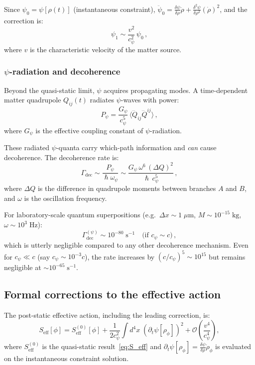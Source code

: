 \documentclass[12pt,a4paper]{article}
\theoremstyle{definition}
\theoremstyle{remark}
\newcommand{\hbar}{\hslash}
\newcommand{\order}{\mathcal{O}}
\begin{document}
Since $\psi_0 = \psi[\rho(t)]$ (instantaneous constraint),
$\ddot{\psi}_0 = \frac{\delta\psi}{\delta\rho}\ddot{\rho}
+ \frac{\delta^2\psi}{\delta\rho^2}(\dot{\rho})^2$,
and the correction is:
\begin{equation}
\psi_1 \sim \frac{v^2}{c_\psi^2}\,\psi_0\,,
\end{equation}
where $v$ is the characteristic velocity of the matter source.

\subsubsection{$\psi$-radiation and decoherence}

Beyond the quasi-static limit, $\psi$ acquires propagating modes.  A
time-dependent matter quadrupole $Q_{ij}(t)$ radiates $\psi$-waves with power:
\begin{equation}
P_\psi = \frac{G_\psi}{c_\psi^5}\,\langle\dddot{Q}_{ij}\dddot{Q}^{ij}\rangle\,,
\end{equation}
where $G_\psi$ is the effective coupling constant of $\psi$-radiation.

These radiated $\psi$-quanta carry which-path information and \emph{can}
cause decoherence.  The decoherence rate is:
\begin{equation}
\Gamma_{\mathrm{dec}} \sim \frac{P_\psi}{\hbar\omega_\psi}
\sim \frac{G_\psi\,\omega^6\,(\Delta Q)^2}{\hbar\,c_\psi^5}\,,
\end{equation}
where $\Delta Q$ is the difference in quadrupole moments between branches $A$
and $B$, and $\omega$ is the oscillation frequency.

For laboratory-scale quantum superpositions (e.g.\ $\Delta x \sim 1\;\mu\mathrm{m}$,
$M \sim 10^{-15}\;\mathrm{kg}$, $\omega \sim 10^3\;\mathrm{Hz}$):
\begin{equation}
\Gamma_{\mathrm{dec}}^{(\psi)} \sim 10^{-80}\;\mathrm{s^{-1}}
\quad\text{(if $c_\psi \sim c$)}\,,
\end{equation}
which is utterly negligible compared to any other decoherence mechanism.
Even for $c_\psi \ll c$ (say $c_\psi \sim 10^{-3}c$), the rate increases
by $(c/c_\psi)^5 \sim 10^{15}$ but remains negligible at $\sim 10^{-65}\;\mathrm{s^{-1}}$.

\subsection{Formal corrections to the effective action}

The post-static effective action, including the leading correction, is:
\begin{equation}
\label{eq:S_eff_corrected}
S_{\mathrm{eff}}[\phi] = S_{\mathrm{eff}}^{(0)}[\phi]
+ \frac{1}{2c_\psi^2}\int d^4x\;\left(\partial_t\psi[\rho_\phi]\right)^2
+ \order\!\left(\frac{v^4}{c_\psi^4}\right),
\end{equation}
where $S_{\mathrm{eff}}^{(0)}$ is the quasi-static result~\eqref{eq:S_eff}
and $\partial_t\psi[\rho_\phi] = \frac{\delta\psi}{\delta\rho}\dot{\rho}_\phi$
is evaluated on the instantaneous constraint solution.
\end{document}
